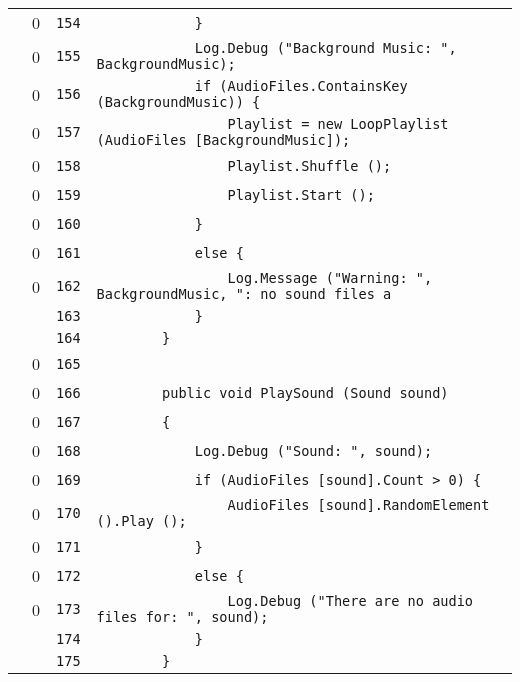 \documentclass[a4paper,10pt]{article}
\begin{document}
\begin{longtable}[l]{lrrl}
\cellcolor{red} & 0 & \verb~154~ & \verb~            }~\\
\cellcolor{red} & 0 & \verb~155~ & \verb~            Log.Debug ("Background Music: ", BackgroundMusic);~\\
\cellcolor{red} & 0 & \verb~156~ & \verb~            if (AudioFiles.ContainsKey (BackgroundMusic)) {~\\
\cellcolor{red} & 0 & \verb~157~ & \verb~                Playlist = new LoopPlaylist (AudioFiles [BackgroundMusic]);~\\
\cellcolor{red} & 0 & \verb~158~ & \verb~                Playlist.Shuffle ();~\\
\cellcolor{red} & 0 & \verb~159~ & \verb~                Playlist.Start ();~\\
\cellcolor{red} & 0 & \verb~160~ & \verb~            }~\\
\cellcolor{red} & 0 & \verb~161~ & \verb~            else {~\\
\cellcolor{red} & 0 & \verb~162~ & \verb~                Log.Message ("Warning: ", BackgroundMusic, ": no sound files a~\\
\cellcolor{gray} &  & \verb~163~ & \verb~            }~\\
\cellcolor{gray} &  & \verb~164~ & \verb~        }~\\
\cellcolor{red} & 0 & \verb~165~ & \verb~~\\
\cellcolor{red} & 0 & \verb~166~ & \verb~        public void PlaySound (Sound sound)~\\
\cellcolor{red} & 0 & \verb~167~ & \verb~        {~\\
\cellcolor{red} & 0 & \verb~168~ & \verb~            Log.Debug ("Sound: ", sound);~\\
\cellcolor{red} & 0 & \verb~169~ & \verb~            if (AudioFiles [sound].Count > 0) {~\\
\cellcolor{red} & 0 & \verb~170~ & \verb~                AudioFiles [sound].RandomElement ().Play ();~\\
\cellcolor{red} & 0 & \verb~171~ & \verb~            }~\\
\cellcolor{red} & 0 & \verb~172~ & \verb~            else {~\\
\cellcolor{red} & 0 & \verb~173~ & \verb~                Log.Debug ("There are no audio files for: ", sound);~\\
\cellcolor{gray} &  & \verb~174~ & \verb~            }~\\
\cellcolor{gray} &  & \verb~175~ & \verb~        }~\\

\end{longtable}
\end{document}
